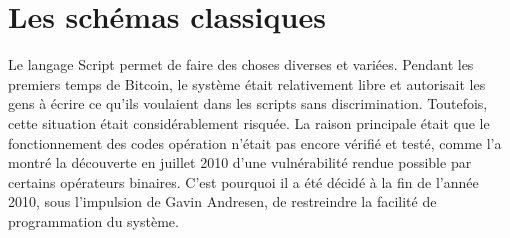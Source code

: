 %
%
%
%
%
%
%


\section*{Les schémas classiques}


Le langage Script permet de faire des choses diverses et variées. Pendant les premiers temps de Bitcoin, le système était relativement libre et autorisait les gens à écrire ce qu'ils voulaient dans les scripts sans discrimination. Toutefois, cette situation était considérablement risquée. La raison principale était que le fonctionnement des codes opération n'était pas encore vérifié et testé, comme l'a montré la découverte en juillet 2010 d'une vulnérabilité rendue possible par certains opérateurs binaires. C'est pourquoi il a été décidé à la fin de l'année 2010, sous l'impulsion de Gavin Andresen, de restreindre la facilité de programmation du système.

